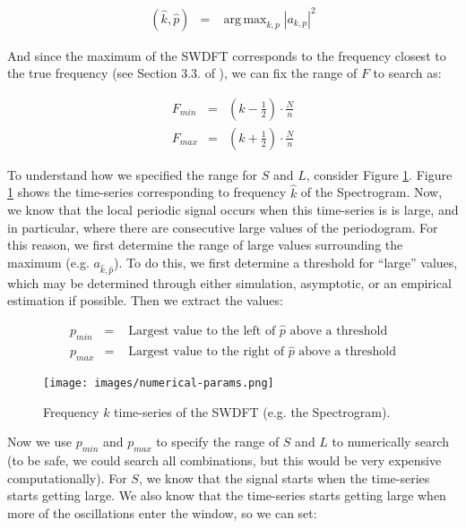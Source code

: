 \documentclass[11pt]{article}
\theoremstyle{plain}
\theoremstyle{definition}
\DeclareMathOperator*{\argmax}{arg\,max}
\begin{document}
\begin{eqnarray}
	(\hat{k}, \hat{p}) &=& \argmax_{k, p} |a_{k,p}|^2
\end{eqnarray}

And since the maximum of the SWDFT corresponds to the frequency closest to the true frequency (see Section 3.3. of \cite{richardson2018timeseries}), we can fix the range of $F$ to search as:

\begin{eqnarray}
	F_{min} &=& (\hat{k} - \frac{1}{2}) \cdot \frac{N}{n} \nonumber \\
	F_{max} &=& (\hat{k} + \frac{1}{2}) \cdot \frac{N}{n} \nonumber
\end{eqnarray}	

To understand how we specified the range for $S$ and $L$, consider Figure \ref{fig:slrange}. Figure \ref{fig:slrange} shows the time-series corresponding to frequency $\hat{k}$ of the Spectrogram. Now, we know that the local periodic signal occurs when this time-series is is large, and in particular, where there are consecutive large values of the periodogram. For this reason, we first determine the range of large values surrounding the maximum (e.g. $a_{\hat{k}, \hat{p}}$). To do this, we first determine a threshold for ``large'' values, which may be determined through either simulation, asymptotic, or an empirical estimation if possible. Then we extract the values:

\begin{eqnarray}
	p_{min} &=& \text{ Largest value to the left of $\hat{p}$ above a threshold} \nonumber \\
	p_{max} &=& \text{ Largest value to the right of $\hat{p}$ above a threshold} \nonumber	
\end{eqnarray}

\begin{figure}[!ht]
  \centering
  \texttt{[image: images/numerical-params.png]}
  \caption{Frequency $k$ time-series of the SWDFT (e.g. the Spectrogram). }
\label{fig:slrange}
\end{figure}

Now we use $p_{min}$ and $p_{max}$ to specify the range of $S$ and $L$ to numerically search (to be safe, we could search all combinations, but this would be very expensive computationally). For $S$, we know that the signal starts when the time-series starts getting large. We also know that the time-series starts getting large when more of the oscillations enter the window, so we can set:
\end{document}
